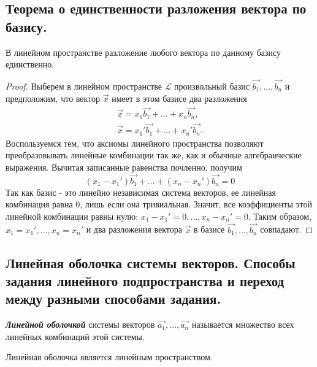 \newpage


\subsection{
    Теорема о единственности разложения вектора по базису.
}

\begin{theorem}
    В линейном пространстве разложение любого вектора по данному базису единственно.
    \label{thm:theorem_2_3}
\end{theorem}

\begin{proof}
    Выберем в линейном пространстве $\mathcal{L}$ произвольный базис $\vec{b_1}, \ldots, \vec{b_n}$ и предположим, что вектор $\vec{x}$ имеет в этом базисе два разложения
    \begin{align*}
        \vec{x} = x_1\vec{b_1} + \ldots + x_n\vec{b_n},\\
        \vec{x} = x_1'\vec{b_1} + \ldots + x_n'\vec{b_n}.
    \end{align*}
    Воспользуемся тем, что аксиомы линейного пространства позволяют преобразовывать линейные комбинации так же, как и обычные алгебраические выражения. Вычитая записанные равенства почленно, получим
    $$(x_1 - x_1')\vec{b_1} + \ldots + (x_n - x_n')\vec{b_n} = 0$$
    Так как базис - это линейно независимая система векторов, ее линейная комбинация равна $0$, лишь если она тривиальная. Значит, все коэффициенты этой линейной комбинации равны нулю: $x_1 - x_1' = 0, \ldots, x_n - x_n' = 0$. Таким образом, $x_1 = x_1', \ldots, x_n = x_n'$ и два разложения вектора $\vec{x}$ в базисе $\vec{b_1}, \ldots, \vec{b_n}$ совпадают.
\end{proof}


\newpage


\subsection{
    Линейная оболочка системы векторов. Способы задания линейного подпространства и переход между разными способами задания.
}

\begin{definition}
    \textbf{\textit{Линейной оболочкой}} системы векторов $\vec{a_1}, \ldots, \vec{a_n}$ называется множество всех линейных комбинаций этой системы.
\end{definition}

\begin{theorem}
    Линейная оболочка является линейным пространством.
\end{theorem}

